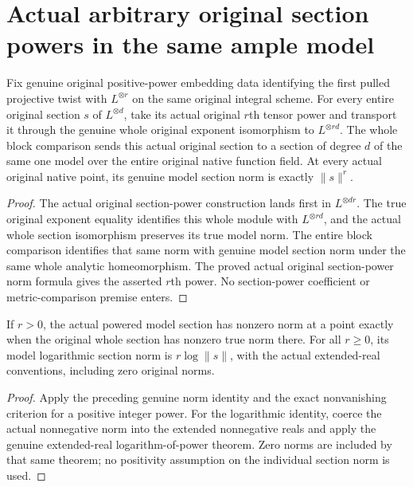 \section{Actual arbitrary original section powers in the same ample model}
\label{sec:native-ample-model-powered-sections}

\begin{theorem}
\label{thm:native-ample-model-powered-section-norm}
\leanok
{}
Fix genuine original positive-power embedding data identifying the first
pulled projective twist with $L^{\otimes r}$ on the same original integral
scheme. For every entire original section $s$ of $L^{\otimes d}$, take its
actual original $r$th tensor power and transport it through the genuine whole
original exponent isomorphism to $L^{\otimes rd}$. The whole block comparison
sends this actual original section to a section of degree $d$ of the same one
model over the entire original native function field. At every actual original
native point, its genuine model section norm is exactly $\lVert s\rVert^r$.
\end{theorem}
\begin{proof}
The actual original section-power construction lands first in
$L^{\otimes dr}$. The true original exponent equality identifies this whole
module with $L^{\otimes rd}$, and the actual whole section isomorphism preserves
its true model norm. The entire block comparison identifies that same norm
with genuine model section norm under the same whole analytic homeomorphism.
The proved actual original section-power norm formula gives the asserted
$r$th power. No section-power coefficient or metric-comparison premise enters.
\end{proof}

\begin{theorem}
\label{thm:native-ample-model-powered-section-lognorm}
\leanok
{}
If $r>0$, the actual powered model section has nonzero norm at a point exactly
when the original whole section has nonzero true norm there. For all $r\ge0$,
its model logarithmic section norm is $r\log\lVert s\rVert$, with the actual
extended-real conventions, including zero original norms.
\end{theorem}
\begin{proof}
Apply the preceding genuine norm identity and the exact nonvanishing criterion
for a positive integer power. For the logarithmic identity, coerce the actual
nonnegative norm into the extended nonnegative reals and apply the genuine
extended-real logarithm-of-power theorem. Zero norms are included by that same
theorem; no positivity assumption on the individual section norm is used.
\end{proof}
